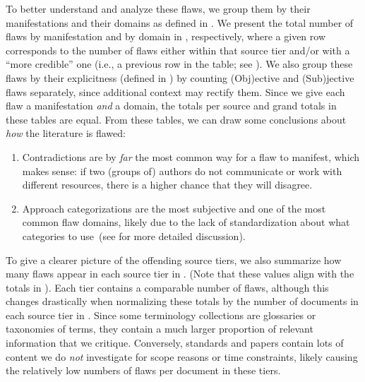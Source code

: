 To better understand and analyze these flaws, we group them by their
manifestations and their domains as defined in .
We present the total number of flaws by manifestation and by domain
in , respectively, where a given
row corresponds to the number of flaws either within that source tier and/or
with a ``more credible'' one (i.e., a previous row in the table; see
). We also group these flaws by their explicitness
(defined in ) by counting (Obj)ective and (Sub)jective flaws
separately, since additional context may rectify them.
Since we give each flaw a manifestation \emph{and} a domain, the totals per
source and grand totals in these tables are equal. From these tables, we can
draw some conclusions about \emph{how} the literature is flawed:
\begin{enumerate}
    \item Contradictions are by \emph{far} the most common way for a flaw to
          manifest, which makes sense: if two (groups of) authors do not
          communicate or work with different resources, there is a higher
          chance that they will disagree.
    \item Approach categorizations are the most subjective and one of the most
          common flaw domains, likely due to the lack of standardization
          about what categories to use\ifnotpaper\ (see 
              for more detailed discussion)\fi.
\end{enumerate}

\ifnotpaper
    

    \begin{landscape}
        \flawMnfstsTable{}
        \flawDmnsTable{}
    \end{landscape}

    
    To give a clearer picture of the offending source tiers, we also summarize
    how many flaws appear in each source tier in .
    (Note that these values align with the totals in ). Each tier contains a comparable number of flaws, although
    this changes drastically when normalizing these totals by the number of
    documents in each source tier in . Since some
    terminology collections are glossaries or taxonomies of terms, they
    contain a much larger proportion of relevant information that we critique.
    Conversely, standards and papers contain lots of content we do \emph{not}
    investigate for scope reasons or time constraints, likely causing the
    relatively low numbers of flaws per document in these tiers.

